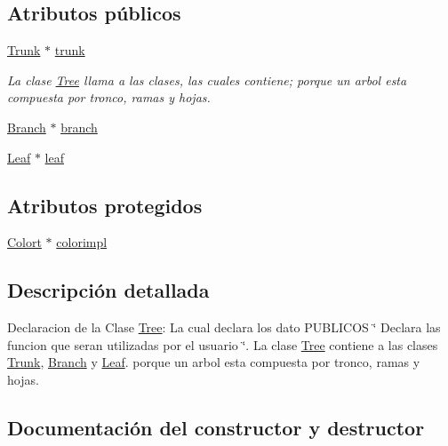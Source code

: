 \subsection*{Atributos públicos}
\begin{DoxyCompactItemize}
\item 
\mbox{\hyperlink{class_trunk}{Trunk}} $\ast$ \mbox{\hyperlink{class_tree_a76114813e02925c4decabe9f837a02a9}{trunk}}
\begin{DoxyCompactList}\small\item\em La clase \mbox{\hyperlink{class_tree}{Tree}} llama a las clases, las cuales contiene; porque un arbol esta compuesta por tronco, ramas y hojas. \end{DoxyCompactList}\item 
\mbox{\hyperlink{class_branch}{Branch}} $\ast$ \mbox{\hyperlink{class_tree_a56e2e117486ac449000deab0efac4a1e}{branch}}
\item 
\mbox{\hyperlink{class_leaf}{Leaf}} $\ast$ \mbox{\hyperlink{class_tree_a4b20e3eadca4c054d79eb7a57579806f}{leaf}}
\end{DoxyCompactItemize}
\subsection*{Atributos protegidos}
\begin{DoxyCompactItemize}
\item 
\mbox{\hyperlink{class_colort}{Colort}} $\ast$ \mbox{\hyperlink{class_tree_a2cd388a817a7325972d81589a6adc62b}{colorimpl}}
\end{DoxyCompactItemize}


\subsection{Descripción detallada}
Declaracion de la Clase \mbox{\hyperlink{class_tree}{Tree}}\+: La cual declara los dato P\+U\+B\+L\+I\+C\+OS \char`\"{} Declara las funcion que seran utilizadas por el usuario \char`\"{}. La clase \mbox{\hyperlink{class_tree}{Tree}} contiene a las clases \mbox{\hyperlink{class_trunk}{Trunk}}, \mbox{\hyperlink{class_branch}{Branch}} y \mbox{\hyperlink{class_leaf}{Leaf}}. porque un arbol esta compuesta por tronco, ramas y hojas. 

\subsection{Documentación del constructor y destructor}
\mbox{\label{class_tree_ad376a7c639d857312f5de2ef47482f68}} 
